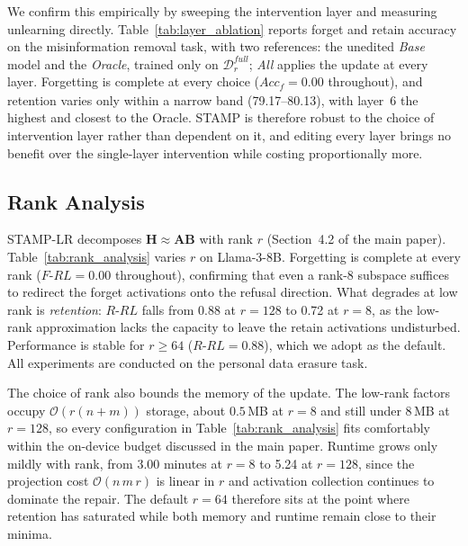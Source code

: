 We confirm this empirically by sweeping the intervention layer and measuring unlearning directly. Table~\ref{tab:layer_ablation} reports forget and retain accuracy on the misinformation removal task, with two references: the unedited \textit{Base} model and the \textit{Oracle}, trained only on $\mathcal{D}_r^{\textit{full}}$; \textit{All} applies the update at every layer. Forgetting is complete at every choice ($Acc_\textit{f} = 0.00$ throughout), and retention varies only within a narrow band (79.17--80.13), with layer~6 the highest and closest to the Oracle. STAMP is therefore robust to the choice of intervention layer rather than dependent on it, and editing every layer brings no benefit over the single-layer intervention while costing proportionally more.

\subsection{Rank Analysis}
\label{sup:rank}
STAMP-LR decomposes $\mathbf{H} \approx \mathbf{A}\mathbf{B}$ with rank $r$ (Section~4.2 of the main paper). Table~\ref{tab:rank_analysis} varies $r$ on Llama-3-8B. Forgetting is complete at every rank ($F\text{-}RL = 0.00$ throughout), confirming that even a rank-8 subspace suffices to redirect the forget activations onto the refusal direction. What degrades at low rank is \textit{retention}: $R\text{-}RL$ falls from 0.88 at $r = 128$ to 0.72 at $r = 8$, as the low-rank approximation lacks the capacity to leave the retain activations undisturbed. Performance is stable for $r \geq 64$ ($R\text{-}RL = 0.88$), which we adopt as the default. All experiments are conducted on the personal data erasure task.

The choice of rank also bounds the memory of the update. The low-rank factors occupy $\mathcal{O}(r(n + m))$ storage, about $0.5$\,MB at $r = 8$ and still under $8$\,MB at $r = 128$, so every configuration in Table~\ref{tab:rank_analysis} fits comfortably within the on-device budget discussed in the main paper. Runtime grows only mildly with rank, from 3.00 minutes at $r = 8$ to 5.24 at $r = 128$, since the projection cost $\mathcal{O}(n\,m\,r)$ is linear in $r$ and activation collection continues to dominate the repair. The default $r = 64$ therefore sits at the point where retention has saturated while both memory and runtime remain close to their minima. %

